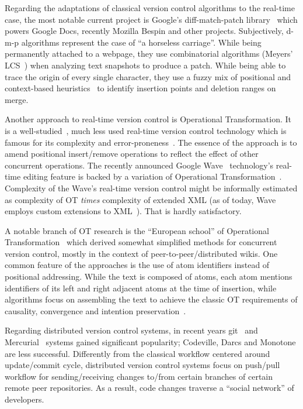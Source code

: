 \documentclass{acm_proc_article-sp}
\begin{document}
Regarding the adaptations of classical version control algorithms to the real-time case, the most notable current project is Google's diff-match-patch library~\cite{dmp} which powers Google Docs, recently Mozilla Bespin and other projects. Subjectively, d-m-p algorithms represent the case of ``a horseless carriage''. While being permanently attached to a webpage, they use combinatorial algorithms (Meyers' LCS~\cite{meyers}) when analyzing text snapshots to produce a patch. While being able to trace the origin of every single character, they use a fuzzy mix of positional and context-based heuristics~\cite{fraser-merge} to identify insertion points and deletion ranges on merge.

Another approach to real-time version control is Operational Transformation. It is a well-studied~\cite{ot1,ot2,ot3}, much less used real-time version control technology which is famous for its complexity and error-proneness~\cite{ot-mistakes}. The essence of the approach is to amend positional insert/remove operations to reflect the effect of other concurrent operations. The recently announced Google Wave~\cite{wave} technology's real-time editing feature is backed by a variation of Operational Transformation~\cite{waveot}. Complexity of the Wave's real-time version control might be informally estimated as complexity of OT \emph{times} complexity of extended XML (as of today, Wave employs custom extensions to XML~\cite{wavexml}). That is hardly satisfactory.

A notable branch of OT research is the ``European school'' of Operational Transformation~\cite{woot,inria,etc} which derived somewhat simplified methods for concurrent version control, mostly in the context of peer-to-peer/distributed wikis. One common feature of the approaches is the use of atom identifiers instead of positional addressing. While the text is composed of atoms, each atom mentions identifiers of its left and right adjacent atoms at the time of insertion, while algorithms focus on assembling the text to achieve the classic OT requirements of causality, convergence and intention preservation~\cite{ot}.

Regarding distributed version control systems, in recent years git~\cite{git} and Mercurial~\cite{mercurial} systems gained significant popularity; Codeville, Darcs and Monotone are less successful. Differently from the classical workflow centered around update/commit cycle, distributed version control systems focus on push/pull workflow for sending/receiving changes to/from certain branches of certain remote peer repositories. As a result, code changes traverse a ``social network'' of developers.
\end{document}

